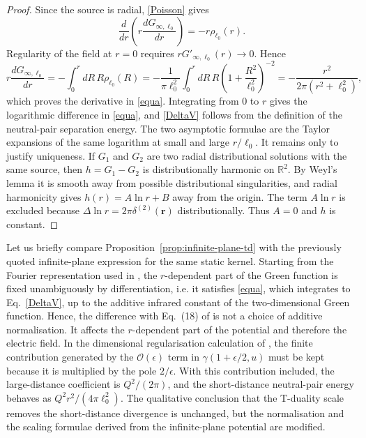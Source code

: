 \documentclass[openacc]{rsproca_new}%
\begin{document}
\begin{proof}
Since the source is radial, \eqref{Poisson} gives
\begin{equation}
  \frac{d}{dr}\left(r\frac{dG_{\infty,\ell_0}}{dr}\right)
  =-r\rho_{\ell_0}(r).
\end{equation}
Regularity of the field at $r=0$ requires $rG'_{\infty,\ell_0}(r)\to 0$. Hence
\begin{equation}\label{intermezzo}
  r\frac{dG_{\infty,\ell_0}}{dr}
  =-\int_0^r dR\,R\rho_{\ell_0}(R)
  =-\frac{1}{\pi\ell_0^2}\int_0^r dR\,R
  \left(1+\frac{R^2}{\ell_0^2}\right)^{-2}
  =-\frac{r^2}{2\pi(r^2+\ell_0^2)},
\end{equation}
which proves the derivative in \eqref{equa}. Integrating from $0$ to $r$ gives the logarithmic difference in \eqref{equa}, and \eqref{DeltaV} follows from the definition of the neutral-pair separation energy. The two asymptotic formulae are the Taylor expansions of the same logarithm at small and large $r/\ell_0$. It remains only to justify uniqueness. If $G_1$ and $G_2$ are two radial distributional solutions with the same source, then $h=G_1-G_2$ is distributionally harmonic on $\mathbb R^2$. By Weyl's lemma it is smooth away from possible distributional singularities, and radial harmonicity gives $h(r)=A\ln r+B$ away from the origin. The term $A\ln r$ is excluded because $\Delta\ln r=2\pi\delta^{(2)}(\mathbf r)$ distributionally. Thus $A=0$ and $h$ is constant.
\end{proof}

Let us briefly compare Proposition~\ref{prop:infinite-plane-td} with the previously quoted infinite-plane expression for the same static kernel. Starting from the Fourier representation used in \cite{GaeteNicolini2026}, the $r$-dependent part of the Green function is fixed unambiguously by differentiation, i.e. it satisfies \eqref{equa}, which integrates to Eq.~\eqref{DeltaV}, up to the additive infrared constant of the two-dimensional Green function. Hence, the difference with Eq.~(18) of \cite{GaeteNicolini2026} is not a choice of additive normalisation. It affects the $r$-dependent part of the potential and therefore the electric field. In the dimensional regularisation calculation of \cite{GaeteNicolini2026}, the finite contribution generated by the $\mathcal O(\epsilon)$ term in $\gamma(1+\epsilon/2,u)$ must be kept because it is multiplied by the pole $2/\epsilon$. With this contribution included, the large-distance coefficient is $Q^2/(2\pi)$, and the short-distance neutral-pair energy behaves as $Q^2r^2/(4\pi\ell_0^2)$. The qualitative conclusion that the T-duality scale removes the short-distance divergence is unchanged, but the normalisation and the scaling formulae derived from the infinite-plane potential are modified.
\end{document}
